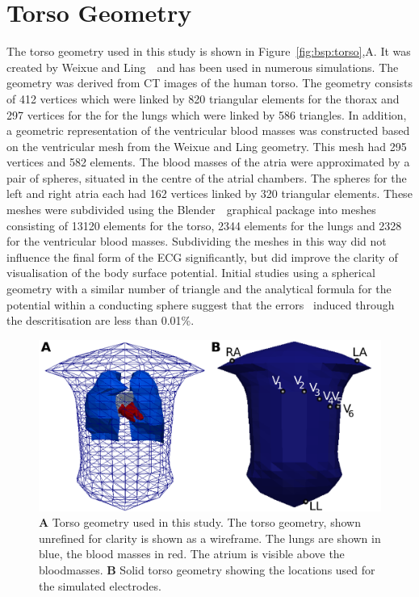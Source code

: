 \section{Torso Geometry}

The torso geometry used in this study is shown in Figure~\ref{fig:bsp:torso},A.
It was created by Weixue and Ling~\cite{Lu1993,Weixue1996}\ and has been
used in numerous simulations.
The geometry was derived from CT images of the human torso.
The geometry consists of 412 vertices which were linked by 820 triangular
elements for the thorax and 297 vertices for the for the lungs which were linked
by 586 triangles.
In addition, a geometric representation of the ventricular blood masses was
constructed based on the ventricular mesh from the Weixue and Ling geometry.
This mesh had 295 vertices and 582 elements.
The blood masses of the atria were approximated by a pair of spheres, situated
in the centre of the atrial chambers.
The spheres for the left and right atria each had 162 vertices linked by 320
triangular elements.
These meshes were subdivided using the Blender~\cite{Blender}\ graphical package
into meshes consisting of 13120 elements for the torso, 2344 elements for the
lungs and 2328 for the ventricular blood masses.
Subdividing the meshes in this way did not influence the final form of the ECG
significantly, but did improve the clarity of visualisation of the body surface
potential.
Initial studies using a spherical geometry with a similar number of triangle and
the analytical formula for the potential within a conducting sphere suggest that
the errors~\cite{Ferguson1997} induced through the descritisation are less
than 0.01\%.

\begin{figure}
\includegraphics{figures/bsp/thorax_layout}
\caption[Torso showing embedded atrium and lead locations]{
\label{bsp:fig:torso}
\textbf{A} Torso geometry used in this study.
The torso geometry, shown unrefined for clarity is shown as a wireframe.
The lungs are shown in blue, the blood masses in red.
The atrium is visible above the bloodmasses.
\textbf{B} Solid torso geometry showing the locations used for the simulated
electrodes.
}
\end{figure}

